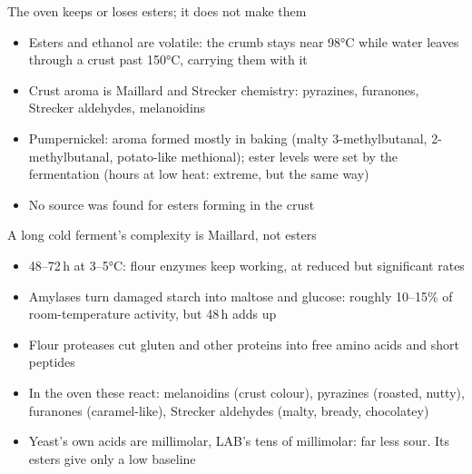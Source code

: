 \documentclass[aspectratio=169,11pt]{beamer}
\newcommand{\muted}[1]{{\color{muted}#1}}
\begin{document}
\begin{frame}{The oven keeps or loses esters; it does not make them}
  \small
  \begin{itemize}\setlength{\itemsep}{0.2em}
    \item Esters and ethanol are volatile: the crumb stays near 98°C while
      water leaves through a crust past 150°C, carrying them with it
    \item Crust aroma is Maillard and Strecker chemistry: pyrazines,
      furanones, Strecker aldehydes, melanoidins
    \item Pumpernickel: aroma formed mostly in baking (malty 3-methylbutanal,
      2-methylbutanal, potato-like methional); ester levels were set by the
      fermentation \muted{(hours at low heat: extreme, but the same way)}
    \item No source was found for esters forming in the crust
  \end{itemize}
\end{frame}

\begin{frame}{A long cold ferment's complexity is Maillard, not esters}
  \small
  \begin{itemize}\setlength{\itemsep}{0.3em}
    \item 48--72\,h at 3--5°C: flour enzymes keep working, at reduced but
      significant rates
    \item Amylases turn damaged starch into maltose and glucose: roughly
      10--15\% of room-temperature activity, but 48\,h adds up
    \item Flour proteases cut gluten and other proteins into free amino
      acids and short peptides
    \item In the oven these react: melanoidins (crust colour), pyrazines
      (roasted, nutty), furanones (caramel-like), Strecker aldehydes (malty,
      bready, chocolatey)
    \item Yeast's own acids are millimolar, LAB's tens of millimolar: far
      less sour. Its esters give only a low baseline
  \end{itemize}
\end{frame}
\end{document}
